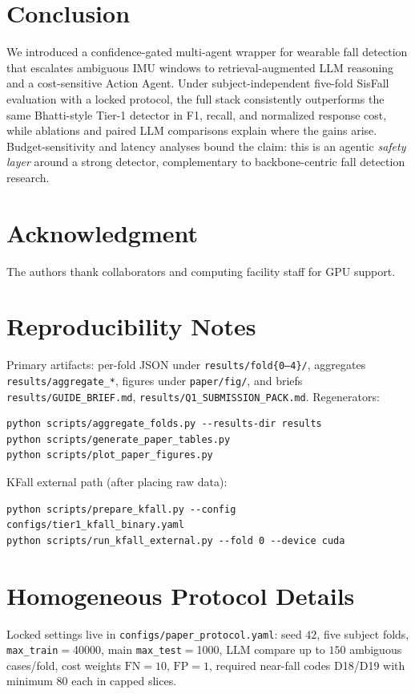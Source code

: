 \documentclass[journal]{IEEEtran}
\begin{document}
\section{Conclusion}
\label{sec:concl}

We introduced a confidence-gated multi-agent wrapper for wearable fall detection that escalates ambiguous IMU windows to retrieval-augmented LLM reasoning and a cost-sensitive Action Agent. Under subject-independent five-fold SisFall evaluation with a locked protocol, the full stack consistently outperforms the same Bhatti-style Tier-1 detector in F1, recall, and normalized response cost, while ablations and paired LLM comparisons explain where the gains arise. Budget-sensitivity and latency analyses bound the claim: this is an agentic \emph{safety layer} around a strong detector, complementary to backbone-centric fall detection research.

\section*{Acknowledgment}
The authors thank collaborators and computing facility staff for GPU support.

\appendices
\section{Reproducibility Notes}
\label{app:repro}
Primary artifacts: per-fold JSON under \texttt{results/fold\{0--4\}/}, aggregates \texttt{results/aggregate\_*}, figures under \texttt{paper/fig/}, and briefs \texttt{results/GUIDE\_BRIEF.md}, \texttt{results/Q1\_SUBMISSION\_PACK.md}. Regenerators:
\begin{verbatim}
python scripts/aggregate_folds.py --results-dir results
python scripts/generate_paper_tables.py
python scripts/plot_paper_figures.py
\end{verbatim}
KFall external path (after placing raw data):
\begin{verbatim}
python scripts/prepare_kfall.py --config configs/tier1_kfall_binary.yaml
python scripts/run_kfall_external.py --fold 0 --device cuda
\end{verbatim}

\section{Homogeneous Protocol Details}
\label{app:protocol}
Locked settings live in \texttt{configs/paper\_protocol.yaml}: seed $42$, five subject folds, \texttt{max\_train}${}={}$40000, main \texttt{max\_test}${}={}$1000, LLM compare up to $150$ ambiguous cases/fold, cost weights $\mathrm{FN}{=}10$, $\mathrm{FP}{=}1$, required near-fall codes D18/D19 with minimum $80$ each in capped slices.



\end{document}

